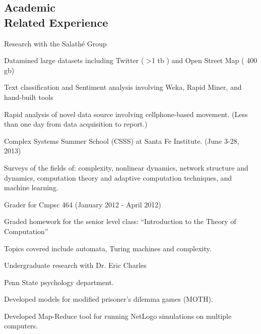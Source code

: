 \documentclass[margin,line]{res}
\newcommand{\linkToUrl}[1]{{\color{blue}\underline{\href{#1}{Link}}}}
\renewcommand{\linkToUrl}[1]{}
\newenvironment{list1}{
  \begin{list}{\ding{113}}{%
      \setlength{\itemsep}{0in}
      \setlength{\parsep}{0in} \setlength{\parskip}{0in}
      \setlength{\topsep}{0in} \setlength{\partopsep}{0in} 
      \setlength{\leftmargin}{0.17in}}}{\end{list}}
\begin{document}
\begin{resume}
\section{\sc Academic \\Related Experience}
Research with the Salath\'e Group%
\begin{list1}
\item[] Datamined large datasets including Twitter  ( \textgreater 1 tb ) and Open Street Map ( 400 gb)
\item[] Text classification and Sentiment analysis involving Weka, Rapid Miner, and hand-built tools
\item[] Rapid analysis of novel data source involving cellphone-based movement. (Less than one day from data acquisition to report.)
\end{list1}
Complex Systems Summer School (CSSS) at Santa Fe Institute. (June 3-28, 2013)
\begin{list1}
\item[] Surveys of the fields of: complexity, nonlinear dynamics, network structure and dynamics, computation theory and adaptive computation techniques, and machine learning.
\end{list1}


Grader for Cmpsc 464 (January 2012 - April 2012)
\begin{list1}
\item[] Graded homework for the senior level class: ``Introduction to the Theory of Computation''
\item[] Topics covered include automata, Turing machines and complexity.
\end{list1}
Undergraduate research with Dr. Eric Charles%
\begin{list1}
\item[] Penn State psychology department.
\item[] Developed models for modified prisoner's dilemma games (MOTH).
\item[] Developed Map-Reduce tool for running NetLogo simulations on multiple computers. \linkToUrl{http://bit.ly/12UQ4cq}
\end{list1}


\end{resume}
\end{document}
